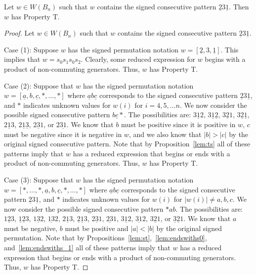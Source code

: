 \begin{proposition}\label{lem:2312}
Let $w \in W(B_n)$ such that $w$ contains the signed consecutive pattern $\underline{2}3\underline{1}$. Then $w$ has Property T.
\begin{proof}
	Let $w \in W(B_n)$ such that $w$ contains the signed consecutive pattern $\underline{2}3\underline{1}$.
	
	Case (1): Suppose $w$ has the signed permutation notation $w=[\underline{2},3,\underline{1}]$. This implies that $w=s_0s_1s_0s_2$. Clearly, some reduced expression for $w$ begins with a product of non-commuting generators. Thus, $w$ has Property T.
	
	Case (2): Suppose that $w$ has the signed permutation notation $w=[\underline{a},b,\underline{c}, \ast, \ldots, \ast]$ where $\underline{a}b\underline{c}$ corresponds to the signed consecutive pattern $\underline{2}3\underline{1}$, and $\ast$ indicates unknown values for $w(i)$ for $i=4,5, \ldots n$. We now consider the possible signed consecutive pattern $b \underline{c} \ast$. The possibilities are: $3\underline{1}2$, $3\underline{1}\underline{2}$, $3\underline{2}1$, $3 \underline{2}\underline{1}$, $2\underline{1}3$, $2\underline{1}\underline{3}$, $2\underline{3}1$, or $2 \underline{31}$. We know that $b$ must be positive since it is positive in $w$, $c$ must be negative since it is negative in $w$, and we also know that $|b|>|c|$ by the original signed consecutive pattern. Note that by Proposition~\ref{lem:ts} all of these patterns imply that $w$ has a reduced expression that begins or ends with a product of non-commuting generators. Thus, $w$ has Property T.
	
	Case (3): Suppose that $w$ has the signed permutation notation $w=[\ast, \ldots,\ast, \underline{a},b,\underline{c}, \ast, \ldots, \ast]$ where $\underline{a}b\underline{c}$ corresponds to the signed consecutive pattern $\underline{2}3\underline{1}$, and $\ast$ indicates unknown values for $w(i)$ for $|w(i)|\neq a,b,c$. We now consider the possible signed consecutive pattern $\ast ab$. The possibilities are: $1 \underline{2} 3$, $\underline{1} \underline{2} 3$, $1\underline{3}2$, $\underline{13}2$,  $2 \underline{1} 3$, $\underline{2} \underline{1} 3$, $2 \underline{3}1$, $\underline{23}1$, $3 \underline{1}2$, $\underline{31}2$, $3 \underline{2} 1$, or $\underline{3} \underline{2} 1$. We know that $a$ must be negative, $b$ must be positive and $|a|<|b|$ by the original signed permutation. Note that by Propositions~\ref{lem:st},~\ref{lem:endswiths0}, and~\ref{lem:endswiths_1} all of these patterns imply that $w$ has a reduced expression that begins or ends with a product of non-commuting generators. Thus, $w$ has Property T. 


\end{proof}
\end{proposition}
